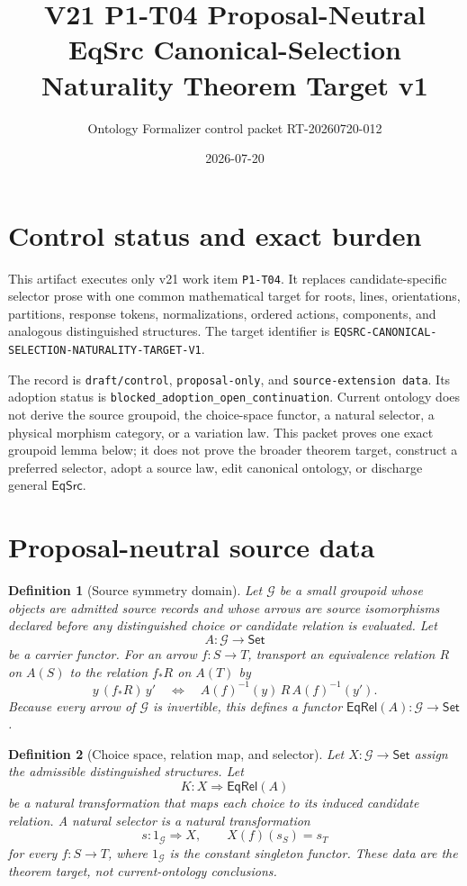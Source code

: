 \documentclass[11pt]{article}
\title{V21 P1-T04 Proposal-Neutral EqSrc Canonical-Selection\\
Naturality Theorem Target v1}
\author{Ontology Formalizer control packet RT-20260720-012}
\date{2026-07-20}
\newtheorem{definition}{Definition}
\newcommand{\EqRel}{\mathsf{EqRel}}
\begin{document}
\maketitle

\section{Control status and exact burden}

This artifact executes only v21 work item \texttt{P1-T04}. It replaces
candidate-specific selector prose with one common mathematical target for
roots, lines, orientations, partitions, response tokens, normalizations,
ordered actions, components, and analogous distinguished structures. The
target identifier is
\texttt{EQSRC-CANONICAL-SELECTION-NATURALITY-TARGET-V1}.

The record is \texttt{draft/control}, \texttt{proposal-only}, and
\texttt{source-extension data}. Its adoption status is
\texttt{blocked\_adoption\_open\_continuation}. Current ontology does not
derive the source groupoid, the choice-space functor, a natural selector, a
physical morphism category, or a variation law. This packet proves one exact
groupoid lemma below; it does not prove the broader theorem target, construct
a preferred selector, adopt a source law, edit canonical ontology, or
discharge general \(\mathsf{EqSrc}\).

\section{Proposal-neutral source data}

\begin{definition}[Source symmetry domain]
Let \(\mathcal G\) be a small groupoid whose objects are admitted source
records and whose arrows are source isomorphisms declared before any
distinguished choice or candidate relation is evaluated. Let
\[
 A:\mathcal G\longrightarrow\mathsf{Set}
\]
be a carrier functor. For an arrow \(f:S\to T\), transport an equivalence
relation \(R\) on \(A(S)\) to the relation \(f_*R\) on \(A(T)\) by
\[
 y\,(f_*R)\,y'
 \quad\Longleftrightarrow\quad
 A(f)^{-1}(y)\,R\,A(f)^{-1}(y').
\]
Because every arrow of \(\mathcal G\) is invertible, this defines a functor
\(\EqRel(A):\mathcal G\to\mathsf{Set}\).
\end{definition}

\begin{definition}[Choice space, relation map, and selector]
Let \(X:\mathcal G\to\mathsf{Set}\) assign the admissible distinguished
structures. Let
\[
 K:X\Longrightarrow\EqRel(A)
\]
be a natural transformation that maps each choice to its induced candidate
relation. A \emph{natural selector} is a natural transformation
\[
 s:1_{\mathcal G}\Longrightarrow X,
 \qquad X(f)(s_S)=s_T
\]
for every \(f:S\to T\), where \(1_{\mathcal G}\) is the constant singleton
functor. These data are the theorem target, not current-ontology conclusions.
\end{definition}
\end{document}
